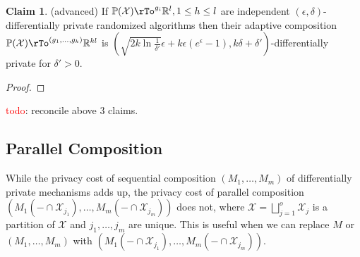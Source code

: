 \documentclass[12pt]{amsart}
\theoremstyle{definition}
\newtheorem{claim}[theorem]{Claim}
\begin{document}
\begin{claim} (advanced) If $\mathbb{P}(\mathbb{\mathcal{X}}) \rTo^{g_i} \mathbb{R}^l, 1 \leq h \leq l$ are independent $(\epsilon, \delta)$-differentially private randomized algorithms then their adaptive composition $\mathbb{P}(\mathbb{\mathcal{X}}) \rTo^{(g_1, \dots, g_k)} \mathbb{R}^{kl}$ is $(\sqrt{2k \ln \frac{1}{\delta '}} \epsilon + k\epsilon( e^{\epsilon} - 1), k \delta + \delta')$-differentially private for $\delta' > 0$.
\end{claim}
\begin{proof}
\end{proof}

\textcolor{red}{todo}: reconcile above 3 claims.

\subsection{Parallel Composition} \label{parallel_composition} While the privacy cost of sequential composition $(M_1, \dots , M_m)$ of differentially private mechanisms adds up, the privacy cost of parallel composition $(M_1(- \cap \mathcal{X}_{j_1}), \dots , M_m(- \cap \mathcal{X}_{j_m}))$ does not, where $\mathcal{X} = \bigsqcup\limits_{j = 1}^o \mathcal{X}_j$ is a partition of $\mathcal{X}$ and $j_1, \dots , j_m$ are unique. This is useful when we can replace $M$ or $(M_1, \dots , M_m)$ with $(M_1(- \cap \mathcal{X}_{j_1}), \dots , M_m(- \cap \mathcal{X}_{j_m}))$.
\end{document}
